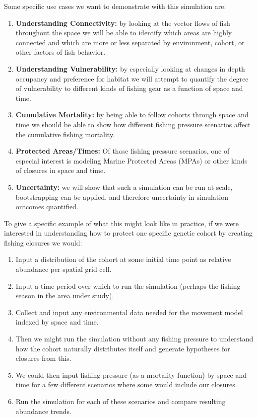 \documentclass[11pt]{article}
\begin{document}
Some specific use cases we want to demonstrate with this simulation are:

\begin{enumerate}
\item \textbf{Understanding Connectivity:} by looking at the vector flows of fish throughout the space we will be able to identify which areas are highly connected and which are more or less separated by environment, cohort, or other factors of fish behavior.
\item \textbf{Understanding Vulnerability:} by especially looking at changes in depth occupancy and preference for habitat we will attempt to quantify the degree of vulnerability to different kinds of fishing gear as a function of space and time. 
\item \textbf{Cumulative Mortality:} by being able to follow cohorts through space and time we should be able to show how different fishing pressure scenarios affect the cumulative fishing mortality.
\item \textbf{Protected Areas/Times:} Of those fishing pressure scenarios, one of especial interest is modeling Marine Protected Areas (MPAs) or other kinds of closures in space and time.
\item \textbf{Uncertainty:} we will show that such a simulation can be run at scale, bootstrapping can be applied, and therefore uncertainty in simulation outcomes quantified. 
\end{enumerate}

To give a specific example of what this might look like in practice, if we were interested in understanding how to protect one specific genetic cohort by creating fishing closures we would:

\begin{enumerate}
\item Input a distribution of the cohort at some initial time point as relative abundance per spatial grid cell.
\item Input a time period over which to run the simulation (perhaps the fishing season in the area under study).
\item Collect and input any environmental data needed for the movement model indexed by space and time.
\item Then we might run the simulation without any fishing pressure to understand how the cohort naturally distributes itself and generate hypotheses for closures from this.
\item We could then input fishing pressure (as a mortality function) by space and time for a few different scenarios where some would include our closures.
\item Run the simulation for each of these scenarios and compare resulting abundance trends. 
\end{enumerate}
\end{document}
